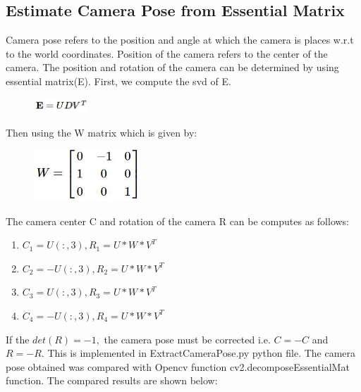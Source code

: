 \documentclass[12pt]{article}
\begin{document}
\subsection{Estimate Camera Pose from Essential Matrix}
Camera pose refers to the position and angle at which the camera is places w.r.t to the world coordinates. Position of the camera refers to the center of the camera. The position and rotation of the camera can be determined by using essential matrix(E). First, we compute the svd of E.
\begin{figure}[h]
    \centering
    \includegraphics[width=2cm]{EM3}
\end{figure}
\newline
Then using the W matrix which is given by:
\newpage
\begin{figure}[h]
    \centering
    \includegraphics[width=4cm]{EM4}
\end{figure}
The camera center C and rotation of the camera R can be computes as follows:
\begin{enumerate}
\item $C_1 = U(:,3) , R_1 = U*W*V^{T}$
\item $C_2 = -U(:,3) , R_2 = U*W*V^{T}$
\item $C_3 = U(:,3) , R_3 = U*W*V^{T}$
\item $C_4 = -U(:,3) , R_4 = U*W*V^{T}$
\end{enumerate}
If the $det(R) = -1,$ the camera pose must be corrected i.e. $C=-C$ and $R=-R$. This is implemented in ExtractCameraPose.py python file. The camera pose obtained was compared with Opencv function cv2.decomposeEssentialMat function. The compared results are shown below:
\end{document}

